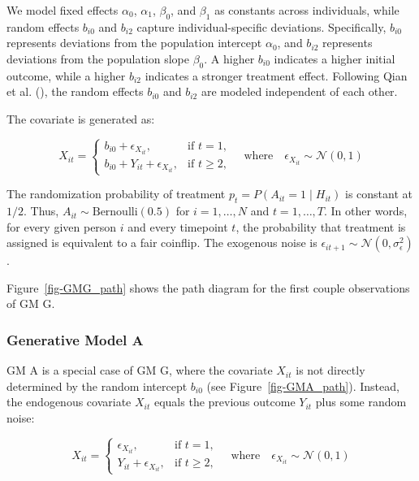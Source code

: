 \documentclass[
  11pt,
  a4paper,
]{article}
\begin{document}
We model fixed effects \(\alpha_0\), \(\alpha_1\), \(\beta_0\), and
\(\beta_1\) as constants across individuals, while random effects
\(b_{i0}\) and \(b_{i2}\) capture individual-specific deviations.
Specifically, \(b_{i0}\) represents deviations from the population
intercept \(\alpha_0\), and \(b_{i2}\) represents deviations from the
population slope \(\beta_0\). A higher \(b_{i0}\) indicates a higher
initial outcome, while a higher \(b_{i2}\) indicates a stronger
treatment effect. Following Qian et al. (),
the random effects \(b_{i0}\) and \(b_{i2}\) are modeled independent of
each other.

The covariate is generated as:

\[
X_{it} = 
\begin{cases} 
b_{i0} + \epsilon_{X_{it}}, & \text{if } t = 1, \\
b_{i0} + Y_{it} + \epsilon_{X_{it}}, & \text{if } t \geq 2,
\end{cases}
\quad \text{where} \quad \epsilon_{X_{it}} \sim \mathcal{N}(0, 1)
\]

The randomization probability of treatment
\(p_t = P(A_{it} = 1 \mid H_{it})\) is constant at \(1/2\). Thus,
\(A_{it} \sim \text{Bernoulli}(0.5)\) for \(i = 1, \ldots, N\) and
\(t = 1, \ldots, T\). In other words, for every given person \(i\) and
every timepoint \(t\), the probability that treatment is assigned is
equivalent to a fair coinflip. The exogenous noise is
\(\epsilon_{it+1} \sim \mathcal{N}(0, \sigma_\epsilon^2)\).

Figure~\ref{fig-GMG_path} shows the path diagram for the first couple
observations of GM G.

\subsubsection{Generative Model A}\label{generative-model-a}

GM A is a special case of GM G, where the covariate \(X_{it}\) is not
directly determined by the random intercept \(b_{i0}\) (see
Figure~\ref{fig-GMA_path}). Instead, the endogenous covariate \(X_{it}\)
equals the previous outcome \(Y_{it}\) plus some random noise:

\[
X_{it} = 
\begin{cases} 
\epsilon_{X_{it}}, & \text{if } t = 1, \\
Y_{it} + \epsilon_{X_{it}}, & \text{if } t \geq 2,
\end{cases}
\quad \text{where} \quad \epsilon_{X_{it}} \sim \mathcal{N}(0, 1)
\]
\end{document}
